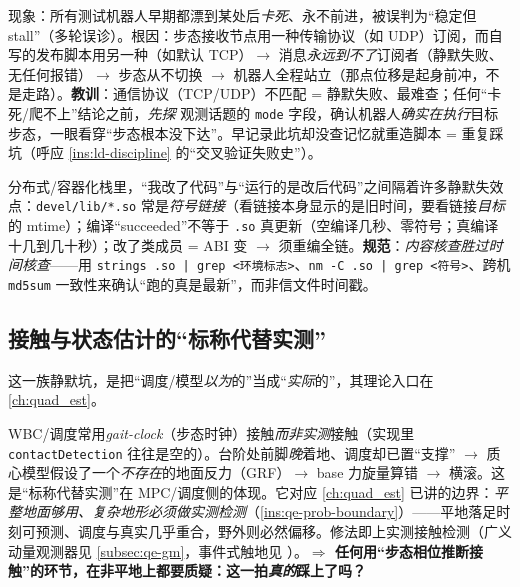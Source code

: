 \begin{insight}\label{ins:ld-transport}
现象：所有测试机器人早期都漂到某处后\emph{卡死}、永不前进，被误判为“稳定但 stall”（多轮误诊）。根因：步态接收节点用一种传输协议（如 UDP）订阅，而自写的发布脚本用另一种（如默认 TCP）$\to$ 消息\emph{永远到不了}订阅者（静默失败、无任何报错）$\to$ 步态从不切换 $\to$ 机器人全程站立（那点位移是起身前冲，不是走路）。\textbf{教训}：通信协议（TCP/UDP）不匹配 = 静默失败、最难查；任何“卡死/爬不上”结论之前，\emph{先探} 观测话题的 \texttt{mode} 字段，确认机器人\emph{确实在执行}目标步态，一眼看穿“步态根本没下达”。早记录此坑却没查记忆就重造脚本 = 重复踩坑（呼应 \cref{ins:ld-discipline} 的“交叉验证失败史”）。
\end{insight}

\begin{insight}\label{ins:ld-stale-binary}
分布式/容器化栈里，“我改了代码”与“运行的是改后代码”之间隔着许多静默失效点：\texttt{devel/lib/*.so} 常是\emph{符号链接}（看链接本身显示的是旧时间，要看链接\emph{目标}的 mtime）；编译“succeeded”不等于 \texttt{.so} 真更新（空编译几秒、零符号；真编译十几到几十秒）；改了类成员 = ABI 变 $\to$ 须重编全链。\textbf{规范}：\emph{内容核查胜过时间核查}——用 \texttt{strings .so | grep <环境标志>}、\texttt{nm -C .so | grep <符号>}、跨机 \texttt{md5sum} 一致性来确认“跑的真是最新”，而非信文件时间戳。
\end{insight}

\subsection{接触与状态估计的“标称代替实测”}
\label{subsec:ld-silent-contact}

这一族静默坑，是把“调度/模型\emph{以为}的”当成“\emph{实际}的”，其理论入口在 \cref{ch:quad_est}。

\begin{insight}\label{ins:ld-gaitclock}
WBC/调度常用\emph{gait-clock}（步态时钟）接触\emph{而非实测}接触（实现里 \texttt{contactDetection} 往往是空的）。台阶处前脚\emph{晚}着地、调度却已置“支撑” $\to$ 质心模型假设了一个\emph{不存在}的地面反力（GRF）$\to$ base 力旋量算错 $\to$ 横滚。这是“标称代替实测”在 MPC/调度侧的体现。它对应 \cref{ch:quad_est} 已讲的边界：\emph{平整地面够用、复杂地形必须做实测检测}（\cref{ins:qe-prob-boundary}）——平地落足时刻可预测、调度与真实几乎重合，野外则必然偏移。修法即上实测接触检测（广义动量观测器见 \cref{subsec:qe-gm}，事件式触地见 \cite{bledt2018contact}）。\textbf{$\Rightarrow$ 任何用“步态相位推断接触”的环节，在非平地上都要质疑：这一拍\emph{真的}踩上了吗？}
\end{insight}

